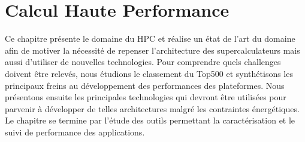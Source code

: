 \chapter{Calcul Haute Performance}\label{chap:hpc}
\minitoc


Ce chapitre présente le domaine du HPC et réalise un état de l'art du domaine afin de motiver la nécessité de repenser l'architecture des supercalculateurs mais aussi d'utiliser de nouvelles technologies. Pour comprendre quels challenges doivent être relevés, nous étudions le classement du Top500 et synthétisons les principaux freins au développement des performances des plateformes. Nous présentons ensuite les principales technologies qui devront être utilisées pour parvenir à développer de telles architectures malgré les contraintes énergétiques. Le chapitre se termine par l'étude des outils permettant la caractérisation et le suivi de performance des applications.











